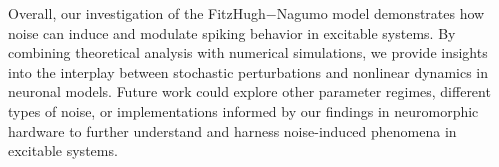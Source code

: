 \documentclass{article}
\begin{document}
Overall, our investigation of the FitzHugh$-$Nagumo model demonstrates how noise can induce and modulate spiking behavior in excitable systems. By combining theoretical analysis with numerical simulations, we provide insights into the interplay between stochastic perturbations and nonlinear dynamics in neuronal models. Future work could explore other parameter regimes, different types of noise, or implementations informed by our findings in neuromorphic hardware to further understand and harness noise-induced phenomena in excitable systems.


\end{document}
